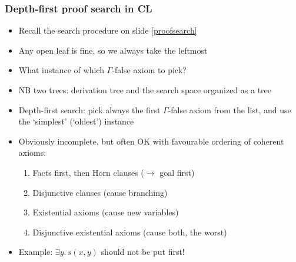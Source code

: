 \documentclass[handout,11pt]{beamer}
\begin{document}
\begin{frame}
\frametitle{Depth-first proof search in CL}
 \begin{itemize}[<+->]   %
    \item Recall the search procedure on slide \ref{proofsearch}
    \item Any open leaf is fine, so we always take the leftmost
    \item What instance of which $\Gamma$-false axiom to pick?
    \item NB two trees: derivation tree and the search space
    organized as a tree
    \item Depth-first search: pick always the first $\Gamma$-false 
    axiom from the list, and use the `simplest' (`oldest') instance
    \item Obviously incomplete, but often OK with
    favourable ordering of coherent axioms:
    \begin{enumerate}
       \item Facts first, then Horn clauses ($\to$ goal first)
       \item Disjunctive clauses (cause branching)
       \item Existential axioms (cause new variables)
       \item Disjunctive existential axioms (cause both, the worst)
    \end{enumerate}
    \item Example: $\exists y.\,s(x,y)$ should not be put first!
 \end{itemize}
\end{frame}


\begin{frame}
  \begin{columns}
    \column{\dimexpr\paperwidth-10pt}
    \small
  \end{columns}
\end{frame}
\end{document}
